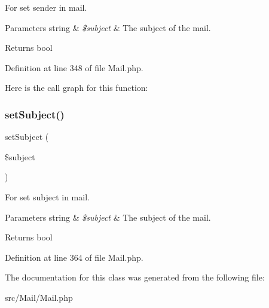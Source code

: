 For set sender in mail.


\begin{DoxyParams}[1]{Parameters}
string & {\em \$subject} & The subject of the mail.\\
\hline
\end{DoxyParams}
\begin{DoxyReturn}{Returns}
bool 
\end{DoxyReturn}


Definition at line 348 of file Mail.\+php.

Here is the call graph for this function\+:
\mbox{\label{class_zest_1_1_mail_1_1_mail_a971f2abb85a2e0fc85954322896d6b80}} 
\subsubsection{\texorpdfstring{set\+Subject()}{setSubject()}}
{\footnotesize\ttfamily set\+Subject (\begin{DoxyParamCaption}\item[{}]{\$subject }\end{DoxyParamCaption})}

For set subject in mail.


\begin{DoxyParams}[1]{Parameters}
string & {\em \$subject} & The subject of the mail.\\
\hline
\end{DoxyParams}
\begin{DoxyReturn}{Returns}
bool 
\end{DoxyReturn}


Definition at line 364 of file Mail.\+php.



The documentation for this class was generated from the following file\+:\begin{DoxyCompactItemize}
\item 
src/\+Mail/Mail.\+php\end{DoxyCompactItemize}
